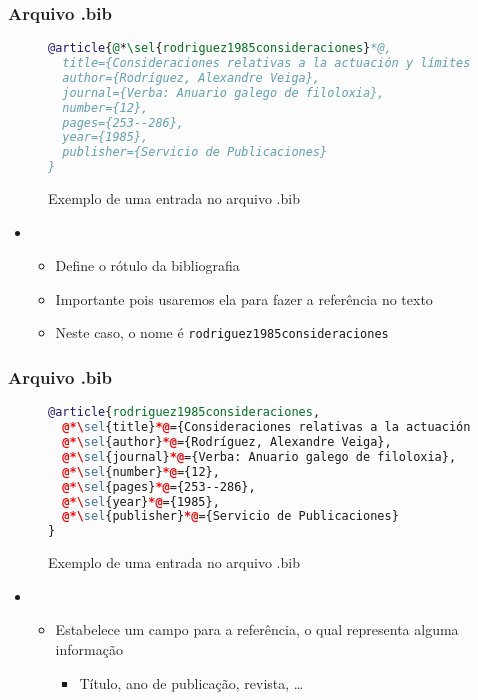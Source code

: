 \begin{frame}[fragile] \frametitle{Arquivo .bib}
\vspace{-0.5cm}
\begin{figure}[!t]
\caption{Exemplo de uma entrada no arquivo .bib}
\begin{lstlisting}[language=BibTeX]
@article{@*\sel{rodriguez1985consideraciones}*@,
  title={Consideraciones relativas a la actuación y límites de las oposiciones fonológicas interrupto/continuo y tenso/flojo en español},
  author={Rodríguez, Alexandre Veiga},
  journal={Verba: Anuario galego de filoloxia},
  number={12},
  pages={253--286},
  year={1985},
  publisher={Servicio de Publicaciones}
}
\end{lstlisting}
\ownsrc
\end{figure}

\begin{itemize}
	\item {}
	\begin{itemize}
		\item Define o rótulo da bibliografia
		\item Importante pois usaremos ela para fazer a referência no texto
		\item Neste caso, o nome é \texttt{rodriguez1985consideraciones}
	\end{itemize}
\end{itemize}

\end{frame}

\begin{frame}[fragile] \frametitle{Arquivo .bib}
\vspace{-0.5cm}
\begin{figure}[!t]
\caption{Exemplo de uma entrada no arquivo .bib}
\begin{lstlisting}[language=BibTeX]
@article{rodriguez1985consideraciones,
  @*\sel{title}*@={Consideraciones relativas a la actuación y límites de las oposiciones fonológicas interrupto/continuo y tenso/flojo en español},
  @*\sel{author}*@={Rodríguez, Alexandre Veiga},
  @*\sel{journal}*@={Verba: Anuario galego de filoloxia},
  @*\sel{number}*@={12},
  @*\sel{pages}*@={253--286},
  @*\sel{year}*@={1985},
  @*\sel{publisher}*@={Servicio de Publicaciones}
}
\end{lstlisting}
\ownsrc
\end{figure}

\begin{itemize}
	\item {}
	\begin{itemize}
		\item Estabelece um campo para a referência, o qual representa alguma informação
		\begin{itemize}
			\item Título, ano de publicação, revista, \ldots
		\end{itemize}
	\end{itemize}
\end{itemize}
\end{frame}

